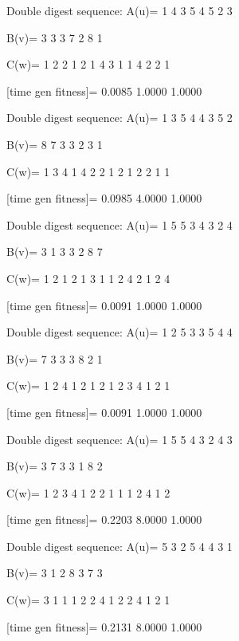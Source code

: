 Double digest sequence:
A(u)=
     1     4     3     5     4     5     2     3

B(v)=
     3     3     3     7     2     8     1

C(w)=
     1     2     2     1     2     1     4     3     1     1     4     2     2     1

[time gen fitness]=
    0.0085    1.0000    1.0000

Double digest sequence:
A(u)=
     1     3     5     4     4     3     5     2

B(v)=
     8     7     3     3     2     3     1

C(w)=
     1     3     4     1     4     2     2     1     2     1     2     2     1     1

[time gen fitness]=
    0.0985    4.0000    1.0000

Double digest sequence:
A(u)=
     1     5     5     3     4     3     2     4

B(v)=
     3     1     3     3     2     8     7

C(w)=
     1     2     1     2     1     3     1     1     2     4     2     1     2     4

[time gen fitness]=
    0.0091    1.0000    1.0000

Double digest sequence:
A(u)=
     1     2     5     3     3     5     4     4

B(v)=
     7     3     3     3     8     2     1

C(w)=
     1     2     4     1     2     1     2     1     2     3     4     1     2     1

[time gen fitness]=
    0.0091    1.0000    1.0000

Double digest sequence:
A(u)=
     1     5     5     4     3     2     4     3

B(v)=
     3     7     3     3     1     8     2

C(w)=
     1     2     3     4     1     2     2     1     1     1     2     4     1     2

[time gen fitness]=
    0.2203    8.0000    1.0000

Double digest sequence:
A(u)=
     5     3     2     5     4     4     3     1

B(v)=
     3     1     2     8     3     7     3

C(w)=
     3     1     1     1     2     2     4     1     2     2     4     1     2     1

[time gen fitness]=
    0.2131    8.0000    1.0000

